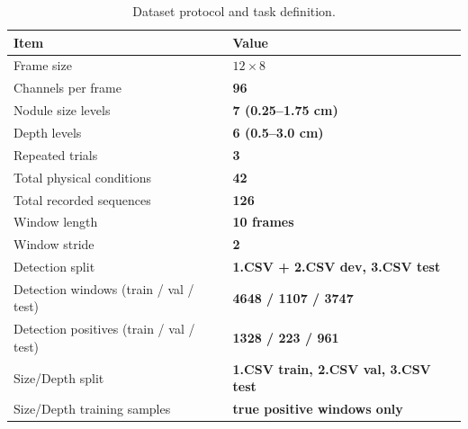 \begin{table}[t]
\caption{Dataset protocol and task definition.}
\label{tab:protocol}
\centering
\begin{tabular}{p{}p{}}
\toprule
Item & Value \\
\midrule
Frame size & $12 \times 8$ \\
Channels per frame & \textbf{96} \\
Nodule size levels & \textbf{7 (0.25--1.75 cm)} \\
Depth levels & \textbf{6 (0.5--3.0 cm)} \\
Repeated trials & \textbf{3} \\
Total physical conditions & \textbf{42} \\
Total recorded sequences & \textbf{126} \\
Window length & \textbf{10 frames} \\
Window stride & \textbf{2} \\
Detection split & \textbf{1.CSV + 2.CSV dev, 3.CSV test} \\
Detection windows (train / val / test) & \textbf{4648 / 1107 / 3747} \\
Detection positives (train / val / test) & \textbf{1328 / 223 / 961} \\
Size/Depth split & \textbf{1.CSV train, 2.CSV val, 3.CSV test} \\
Size/Depth training samples & \textbf{true positive windows only} \\
\bottomrule
\end{tabular}
\end{table}
